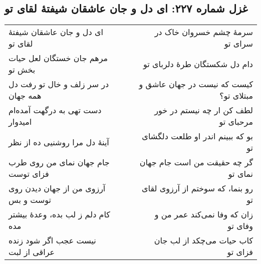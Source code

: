 \begin{center}
\section*{غزل شماره ۲۲۷: ای دل و جان عاشقان شیفتهٔ لقای تو}
\label{sec:227}
\begin{longtable}{l p{0.5cm} r}
ای دل و جان عاشقان شیفتهٔ لقای تو
&&
سرمهٔ چشم خسروان خاک در سرای تو
\\
مرهم جان خستگان لعل حیات بخش تو
&&
دام دل شکستگان طرهٔ دلربای تو
\\
در سر زلف و خال تو رفت دل همه جهان
&&
کیست که نیست در جهان عاشق و مبتلای تو؟
\\
دست تهی به درگهت آمده‌ام امیدوار
&&
لطف کن ار چه نیستم در خور مرحبای تو
\\
آینهٔ دل مرا روشنیی ده از نظر
&&
بو که ببینم اندر او طلعت دلگشای تو
\\
جام جهان نمای من روی طرب فزای توست
&&
گر چه حقیقت من است جام جهان نمای تو
\\
آرزوی من از جهان دیدن روی توست و بس
&&
رو بنما، که سوختم از آرزوی لقای تو
\\
کام دلم ز لب بده، وعدهٔ بیشتر مده
&&
زان که وفا نمی‌کند عمر من و وفای تو
\\
نیست عجب اگر شود زنده عراقی از لبت
&&
کاب حیات می‌چکد از لب جان فزای تو
\\
\end{longtable}
\end{center}
